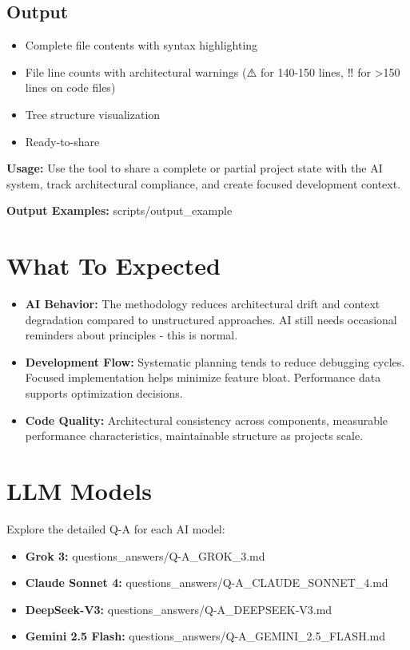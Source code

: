 \documentclass{article}
\begin{document}
\subsection{Output}
\begin{itemize}[noitemsep]
\item Complete file contents with syntax highlighting
\item File line counts with architectural warnings (⚠️ for 140-150 lines, ‼️ for >150 lines on code files)
\item Tree structure visualization
\item Ready-to-share
\end{itemize}

\textbf{Usage:} Use the tool to share a complete or partial project state with the AI system, track architectural compliance, and create focused development context.

\textbf{Output Examples:} scripts/output\_example

\section{What To Expected}

\begin{itemize}[noitemsep]
\item \textbf{AI Behavior:} The methodology reduces architectural drift and context degradation compared to unstructured approaches. AI still needs occasional reminders about principles - this is normal.
\item \textbf{Development Flow:} Systematic planning tends to reduce debugging cycles. Focused implementation helps minimize feature bloat. Performance data supports optimization decisions.
\item \textbf{Code Quality:} Architectural consistency across components, measurable performance characteristics, maintainable structure as projects scale.
\end{itemize}

\section{LLM Models}
Explore the detailed Q-A for each AI model:

\begin{itemize}[noitemsep]
\item \textbf{Grok 3:} questions\_answers/Q-A\_GROK\_3.md
\item \textbf{Claude Sonnet 4:} questions\_answers/Q-A\_CLAUDE\_SONNET\_4.md
\item \textbf{DeepSeek-V3:} questions\_answers/Q-A\_DEEPSEEK-V3.md
\item \textbf{Gemini 2.5 Flash:} questions\_answers/Q-A\_GEMINI\_2.5\_FLASH.md
\end{itemize}
\end{document}

